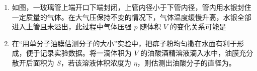 \documentclass[\gkver]{gaokaozhenti}
\begin{document}
\begin{enumerate}
{D．电子和质子都在 O 点左侧，电子在 O 点产生的电场向左，质子在 O 点产生的电场向右，$E_{D} = \frac{ke}{D^{2}} - \frac{ke}{(d + D)^{2}}$。

因为 $d < d + D$，所以 $\frac{ke}{d^{2}} > \frac{ke}{(d + D)^{2}}$，$E_{C} > E_{B}$；$E_{C}$ 显然也大于 $E_{A}$ 和 $E_{D}$。所以 O 点电场强度最大的是 C 中的排布方式。

故选 C。
}

\item
如图，一玻璃管上端开口下端封闭，上管内径小于下管内径，管内用水银封住一定质量的气体。在大气压保持不变的情况下，气体温度缓慢升高，水银全部进入上管且未溢出，此过程中气体压强 $p$ 随体积 $V$ 的变化关系可能是
\onepicture[h=3.6cm, align=right]{}
\fourchoices[answer=C, ispicture=true, h=2.2cm]
{}
{}
{}
{}

\item
在“用单分子油膜估测分子的大小”实验中，把痱子粉均匀撒在水面有利于形成\newline{}，便于记录实验数据。将一滴体积为 $V$ 的油酸酒精溶液滴入水中，油膜充分散开后面积为 $S$，若该溶液体积浓度为 $\eta$，则估测出油酸分子的直径为。
\end{enumerate}
\end{document}
